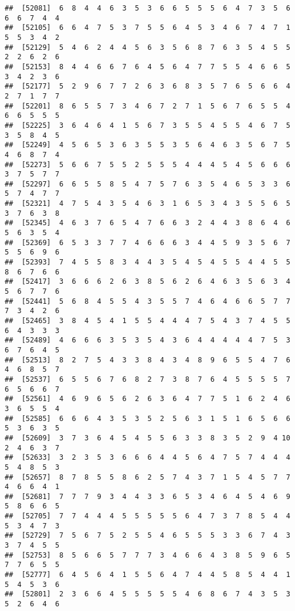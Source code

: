 \documentclass[
]{book}
\begin{document}
\begin{verbatim}
##  [52081]  6  8  4  4  6  3  5  3  6  6  5  5  5  6  4  7  3  5  6  6  6  7  4  4
##  [52105]  6  6  4  7  5  3  7  5  5  6  4  5  3  4  6  7  4  7  1  5  5  3  4  2
##  [52129]  5  4  6  2  4  4  5  6  3  5  6  8  7  6  3  5  4  5  5  2  2  6  2  6
##  [52153]  8  4  4  6  6  7  6  4  5  6  4  7  7  5  5  4  6  6  5  3  4  2  3  6
##  [52177]  5  2  9  6  7  7  2  6  3  6  8  3  5  7  6  5  6  6  4  2  7  1  7  7
##  [52201]  8  6  5  5  7  3  4  6  7  2  7  1  5  6  7  6  5  5  4  6  6  5  5  5
##  [52225]  3  6  4  6  4  1  5  6  7  3  5  5  4  5  5  4  6  7  5  3  5  8  4  5
##  [52249]  4  5  6  5  3  6  3  5  5  3  5  6  4  6  3  5  6  7  5  4  6  8  7  4
##  [52273]  5  6  6  7  5  5  2  5  5  5  4  4  4  5  4  5  6  6  6  3  7  5  7  7
##  [52297]  6  6  5  5  8  5  4  7  5  7  6  3  5  4  6  5  3  3  6  5  7  4  7  7
##  [52321]  4  7  5  4  3  5  4  6  3  1  6  5  3  4  3  5  5  6  5  3  7  6  3  8
##  [52345]  4  6  3  7  6  5  4  7  6  6  3  2  4  4  3  8  6  4  6  5  6  3  5  4
##  [52369]  6  5  3  3  7  7  4  6  6  6  3  4  4  5  9  3  5  6  7  5  5  6  9  6
##  [52393]  7  4  5  5  8  3  4  4  3  5  4  5  4  5  5  4  4  5  5  8  6  7  6  6
##  [52417]  3  6  6  6  2  6  3  8  5  6  2  6  4  6  3  5  6  3  4  5  6  7  7  6
##  [52441]  5  6  8  4  5  5  4  3  5  5  7  4  6  4  6  6  5  7  7  7  3  4  2  6
##  [52465]  3  8  4  5  4  1  5  5  4  4  4  7  5  4  3  7  4  5  5  6  4  3  3  3
##  [52489]  4  6  6  6  3  5  3  5  4  3  6  4  4  4  4  4  7  5  3  6  7  6  4  5
##  [52513]  8  2  7  5  4  3  3  8  4  3  4  8  9  6  5  5  4  7  6  4  6  8  5  7
##  [52537]  6  5  5  6  7  6  8  2  7  3  8  7  6  4  5  5  5  5  7  6  5  6  6  7
##  [52561]  4  6  9  6  5  6  2  6  3  6  4  7  7  5  1  6  2  4  6  3  6  5  5  4
##  [52585]  6  6  6  4  3  5  3  5  2  5  6  3  1  5  1  6  5  6  6  5  3  6  3  5
##  [52609]  3  7  3  6  4  5  4  5  5  6  3  3  8  3  5  2  9  4 10  2  4  6  3  7
##  [52633]  3  2  3  5  3  6  6  6  4  4  5  6  4  7  5  7  4  4  4  5  4  8  5  3
##  [52657]  8  7  8  5  5  8  6  2  5  7  4  3  7  1  5  4  5  7  7  4  6  6  4  1
##  [52681]  7  7  7  9  3  4  4  3  3  6  5  3  4  6  4  5  4  6  9  5  8  6  6  5
##  [52705]  7  7  4  4  4  5  5  5  5  5  6  4  7  3  7  8  5  4  4  5  3  4  7  3
##  [52729]  7  5  6  7  5  2  5  5  4  6  5  5  5  3  3  6  7  4  3  3  7  4  5  5
##  [52753]  8  5  6  6  5  7  7  7  3  4  6  6  4  3  8  5  9  6  5  7  7  6  5  5
##  [52777]  6  4  5  6  4  1  5  5  6  4  7  4  4  5  8  5  4  4  1  5  4  5  3  6
##  [52801]  2  3  6  6  4  5  5  5  5  5  4  6  8  6  7  4  3  5  3  5  2  6  4  6

\end{verbatim}
\end{document}
